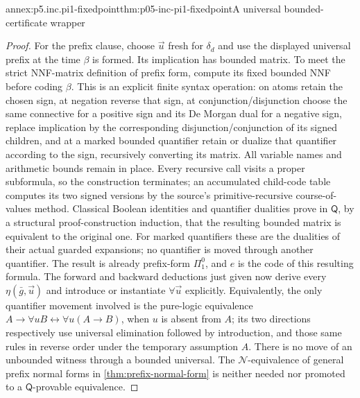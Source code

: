 \begin{annexitem}{annex:p5.inc.pi1-fixedpoint}{thm:p05-inc-pi1-fixedpoint}{A universal bounded-certificate wrapper}
\begin{proof}
For the prefix clause, choose \(\vec u\) fresh for \(\delta_d\)
and use the displayed universal prefix at the time \(\beta\) is
formed. Its implication has bounded matrix. To meet the strict
NNF-matrix definition of prefix form, compute its fixed bounded NNF
before coding \(\beta\). This is an explicit finite syntax operation:
on atoms retain the chosen sign, at negation reverse that sign, at
conjunction/disjunction choose the same connective for a positive sign
and its De Morgan dual for a negative sign, replace implication by
the corresponding disjunction/conjunction of its signed children,
and at a marked bounded quantifier retain or dualize that quantifier
according to the sign, recursively converting its matrix. All variable
names and arithmetic bounds remain in place. Every recursive call
visits a proper subformula, so the construction terminates; an
accumulated child-code table computes its two signed versions by
the source's primitive-recursive course-of-values method.
Classical Boolean identities and quantifier dualities prove in
\(\mathsf Q\), by a structural proof-construction induction, that
the resulting bounded matrix is equivalent to the original one.
For marked quantifiers these are the dualities of their actual guarded
expansions; no quantifier is moved through another quantifier. The
result is already prefix-form \(\Pi^0_1\), and \(e\) is the code
of this resulting formula. The forward and
backward deductions just given now derive every
\(\eta(\bar g,\vec u)\) and introduce or instantiate
\(\forall\vec u\) explicitly. Equivalently, the only quantifier
movement involved is the pure-logic equivalence
\(A\to\forall u B\leftrightarrow\forall u(A\to B)\), when
\(u\) is absent from \(A\); its two directions respectively use
universal elimination followed by introduction, and those same rules
in reverse order under the temporary assumption \(A\).
There is no move of an unbounded witness through a bounded universal.
The \(\mathcal N\)-equivalence of general prefix normal forms in
\cref{thm:prefix-normal-form} is neither needed nor promoted to a
\(\mathsf Q\)-provable equivalence.
\end{proof}
\end{annexitem}

